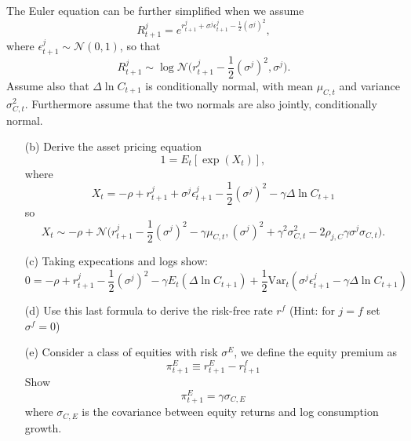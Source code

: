 \documentclass[11pt]{extarticle}
\theoremstyle{plain}
\theoremstyle{definition}
\begin{document}
The Euler equation can be further simplified when we assume
\begin{equation*}
	R_{t+1}^j = e^{r_{t+1}^j + \sigma^j \epsilon_{t+1}^j - \frac{1}{2} (\sigma^j)^2},
\end{equation*}
where $\epsilon_{t+1}^j \sim \mathcal{N}(0,1)$, so that 
\begin{equation*}
	R_{t+1}^j  \sim \log \mathcal{N} \bigg(r_{t+1}^j - \frac{1}{2} (\sigma^j)^2, \sigma^j\bigg).
\end{equation*}
Assume also that $\Delta \ln  C_{t+1}$ is conditionally normal, with mean $\mu_{C,t}$ and variance $\sigma_{C,t}^2$. Furthermore assume that the two normals are also jointly, conditionally normal.


\begin{enumerate}
\item [(b)] Derive the asset pricing equation
\begin{equation*}
	1 = E_t [\exp(X_t)],
\end{equation*}
where 
\begin{equation*}
	X_t = -\rho + r_{t+1}^j + \sigma^j \epsilon_{t+1}^j - \frac{1}{2} (\sigma^j)^2 - \gamma \Delta \ln C_{t+1} 
\end{equation*}
so
\begin{equation*}
X_t \sim -\rho + \mathcal{N}\bigg(r_{t+1}^j - \frac{1}{2} (\sigma^j)^2 - \gamma \mu_{C,t}, (\sigma^j)^2 + \gamma^2 \sigma_{C,t}^2 - 2 \rho_{j,C} \gamma \sigma^j \sigma_{C,t} \bigg).
\end{equation*}

\item [(c)] Taking expecations and logs show:
\begin{equation}
	0 =  - \rho + r_{t+1}^j - \frac{1}{2} (\sigma^j)^2 - \gamma E_t(\Delta \ln C_{t+1}) + \frac{1}{2} \text{Var}_t( \sigma^j \epsilon_{t+1}^j - \gamma \Delta \ln C_{t+1})
\end{equation}

\item [(d)] Use this last formula to derive the risk-free rate $r^f$ (Hint: for $j=f$ set $\sigma^f=0$)

\item [(e)] Consider a class of equities with risk $\sigma^E$, we define the equity premium as $$\pi_{t+1}^E \equiv r_{t+1}^E - r_{t+1}^f $$
Show $$\pi_{t+1}^E = \gamma \sigma_{C,E}$$ where $\sigma_{C,E}$ is the covariance between equity returns and log consumption growth. 

\end{enumerate}
\end{document}
